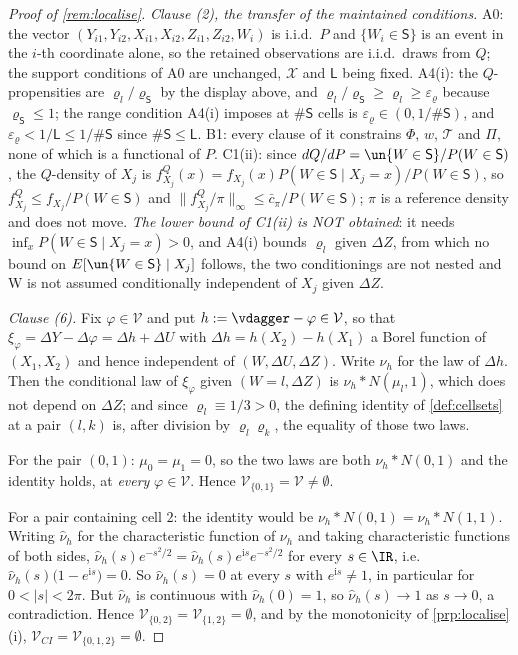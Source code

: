 \begin{proof}[Proof of \cref{rem:localise}]
\emph{Clause \textup{(2)}, the transfer of the maintained conditions.} A0: the vector
$(Y_{i1},Y_{i2},X_{i1},X_{i2},Z_{i1},Z_{i2},W_i)$ is i.i.d.\ $P$ and $\{W_i\in\mathsf S\}$ is an event
in the $i$-th coordinate alone, so the retained observations are i.i.d.\ draws from $Q$; the support
conditions of A0 are unchanged, $\mathcal X$ and $\mathsf L$ being fixed. A4(i): the $Q$-propensities
are $\varrho_l/\varrho_{\mathsf S}$ by the display above, and
$\varrho_l/\varrho_{\mathsf S}\ge\varrho_l\ge\varepsilon_\varrho$ because
$\varrho_{\mathsf S}\le1$; the range condition A4(i) imposes at $\#\mathsf S$ cells is
$\varepsilon_\varrho\in(0,1/\#\mathsf S)$, and $\varepsilon_\varrho<1/\mathsf L\le1/\#\mathsf S$ since
$\#\mathsf S\le\mathsf L$. B1: every clause of it constrains $\Phi$, $w$, $\mathcal T$ and $\Pi$, none
of which is a functional of $P$. C1(ii): since $dQ/dP=\un\{W\in\mathsf S\}/P(W\in\mathsf S)$, the
$Q$-density of $X_j$ is $f^{Q}_{X_j}(x)=f_{X_j}(x)P(W\in\mathsf S\mid X_j=x)/P(W\in\mathsf S)$, so
$f^{Q}_{X_j}\le f_{X_j}/P(W\in\mathsf S)$ and
$\|f^{Q}_{X_j}/\pi\|_\infty\le\bar c_\pi/P(W\in\mathsf S)$; $\pi$ is a reference density and does not
move. \emph{The lower bound of C1(ii) is NOT obtained}: it needs
$\inf_xP(W\in\mathsf S\mid X_j=x)>0$, and A4(i) bounds $\varrho_l$ given $\Delta Z$, from which no
bound on $E[\un\{W\in\mathsf S\}\mid X_j]$ follows, the two conditionings are not nested and W is
not assumed conditionally independent of $X_j$ given $\Delta Z$.

\emph{Clause \textup{(6)}.} Fix $\varphi\in\mathcal V$ and put $h:=\vdagger-\varphi\in\mathcal V$, so
that $\xi_\varphi=\Delta Y-\Delta\varphi=\Delta h+\Delta U$ with
$\Delta h=h(X_2)-h(X_1)$ a Borel function of $(X_1,X_2)$ and hence independent of
$(W,\Delta U,\Delta Z)$. Write $\nu_h$ for the law of $\Delta h$. Then the conditional law of
$\xi_\varphi$ given $(W=l,\Delta Z)$ is $\nu_h\ast N(\mu_l,1)$, which does not depend on $\Delta Z$;
and since $\varrho_l\equiv1/3>0$, the defining identity of \cref{def:cellsets} at a pair $(l,k)$ is,
after division by $\varrho_l\varrho_k$, the equality of those two laws.

For the pair $(0,1)$: $\mu_0=\mu_1=0$, so the two laws are both $\nu_h\ast N(0,1)$ and the identity
holds, at \emph{every} $\varphi\in\mathcal V$. Hence $\mathcal V_{\{0,1\}}=\mathcal V\neq\emptyset$.

For a pair containing cell $2$: the identity would be $\nu_h\ast N(0,1)=\nu_h\ast N(1,1)$. Writing
$\hat\nu_h$ for the characteristic function of $\nu_h$ and taking characteristic functions of both
sides, $\hat\nu_h(s)e^{-s^{2}/2}=\hat\nu_h(s)e^{\mathrm is}e^{-s^{2}/2}$ for every $s\in\IR$, i.e.
$\hat\nu_h(s)\big(1-e^{\mathrm is}\big)=0$. So $\hat\nu_h(s)=0$ at every $s$ with
$e^{\mathrm is}\neq1$, in particular for $0<|s|<2\pi$. But $\hat\nu_h$ is continuous with
$\hat\nu_h(0)=1$, so $\hat\nu_h(s)\to1$ as $s\to0$, a contradiction. Hence
$\mathcal V_{\{0,2\}}=\mathcal V_{\{1,2\}}=\emptyset$, and by the monotonicity of
\cref{prp:localise}\textup{(i)}, $\mathcal V_{CI}=\mathcal V_{\{0,1,2\}}=\emptyset$.


\end{proof}
